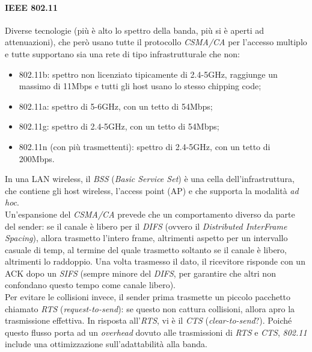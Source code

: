 \paragraph{IEEE 802.11}
Diverse tecnologie (più è alto lo spettro della banda, più si è aperti ad attenuazioni), che però usano tutte il protocollo \textit{CSMA/CA} per l'accesso multiplo e tutte supportano sia una rete di tipo infrastrutturale che non:
\begin{itemize}
	\item 802.11b: spettro non licenziato tipicamente di 2.4-5GHz, raggiunge un massimo di 11Mbps e tutti gli host usano lo stesso chipping code;
	\item 802.11a: spettro di 5-6GHz, con un tetto di 54Mbps;
	\item 802.11g: spettro di 2.4-5GHz, con un tetto di 54Mbps;
	\item 802.11n (con più trasmettenti): spettro di 2.4-5GHz, con un tetto di 200Mbps.
\end{itemize}

In una LAN wireless, il \textit{BSS} (\textit{Basic Service Set}) è una cella dell'infrastruttura, che contiene gli host wireless, l'access point (AP) e che supporta la modalità \textit{ad hoc}. \\
Un'espansione del \textit{CSMA/CA} prevede che un comportamento diverso da parte del sender: se il canale è libero per il \textit{DIFS} (ovvero il \textit{Distributed InterFrame Spacing}), allora trasmetto l'intero frame, altrimenti aspetto per un intervallo casuale di temp, al termine del quale trasmetto soltanto se il canale è libero, altrimenti lo raddoppio. Una volta trasmesso il dato, il ricevitore risponde con un ACK dopo un \textit{SIFS} (sempre minore del \textit{DIFS}, per garantire che altri non confondano questo tempo come canale libero). \\
Per evitare le collisioni invece, il sender prima trasmette un piccolo pacchetto chiamato \textit{RTS} (\textit{request-to-send}): se questo non cattura collisioni, allora apro la trasmissione effettiva. In risposta all'\textit{RTS}, vi è il \textit{CTS} (\textit{clear-to-send}?).
Poiché questo flusso porta ad un \textit{overhead} dovuto alle trasmissioni di \textit{RTS} e \textit{CTS}, \textit{802.11} include una ottimizzazione sull'adattabilità alla banda.


